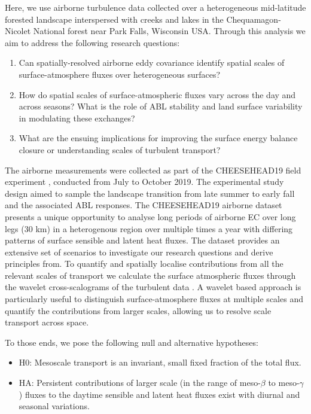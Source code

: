 \documentclass[draft]{agujournal2019}
\begin{document}
Here, we use airborne turbulence data collected over a heterogeneous mid-latitude forested landscape interspersed with creeks and lakes in the Chequamagon-Nicolet National forest near Park Falls, Wisconsin USA.  Through this analysis we aim to address the following research questions:
\begin{enumerate}
    \item Can spatially-resolved airborne eddy covariance identify spatial scales of surface-atmosphere fluxes over heterogeneous surfaces?
    \item How do spatial scales of surface-atmospheric fluxes vary across the day and across seasons? What is the role of ABL stability and land surface variability in modulating these exchanges?
    \item What are the ensuing  implications for improving the surface energy balance closure or understanding scales of turbulent transport?
\end{enumerate}

The airborne measurements were collected as part of the CHEESEHEAD19 field experiment \cite{butterworth_connecting_2021}, conducted from July to October 2019.  The experimental study design aimed to sample the landscape transition from late summer to early fall and the associated ABL responses.  The CHEESEHEAD19 airborne dataset presents a unique opportunity to analyse long periods of airborne EC over long legs (30 km) in a heterogenous region over multiple times a year with differing patterns of surface sensible and latent heat fluxes.  The dataset provides an extensive set of scenarios to investigate our research questions and derive principles from. To quantify and spatially localise contributions from all the relevant scales of transport we calculate the surface atmospheric fluxes through the wavelet cross-scalograms of the turbulent data \cite{strunin_applying_2004, strunin_spectral_2005, mauder_scale_2007, metzger_spatially_2013}. A wavelet based approach is particularly useful to distinguish surface-atmosphere fluxes at multiple scales and quantify the contributions from larger scales, allowing us to resolve scale transport across space.

To those ends, we pose the following  null and alternative hypotheses:
\begin{itemize}
    \item H0: Mesoscale transport is an invariant, small fixed fraction of the total flux.
    \item HA: Persistent contributions of larger scale (in the range of meso-$\beta$ to meso-$\gamma$ ) fluxes to the daytime sensible and latent heat fluxes exist with diurnal and seasonal variations.
\end{itemize}
\end{document}
